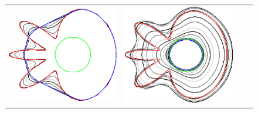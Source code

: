 \begin{figure}
\begin{tabular}{cccc}
\includegraphics[scale=0.18]{figures/chapter9/free-elastica/balanceflow/flower/len_pen-0.01/radius-7/summary.pdf} &
\includegraphics[scale=0.18]{figures/chapter9/free-elastica/graphflow/flower/len_pen-0.01/radius-7/summary.pdf} \\[1em]

\end{tabular}
\end{figure}
